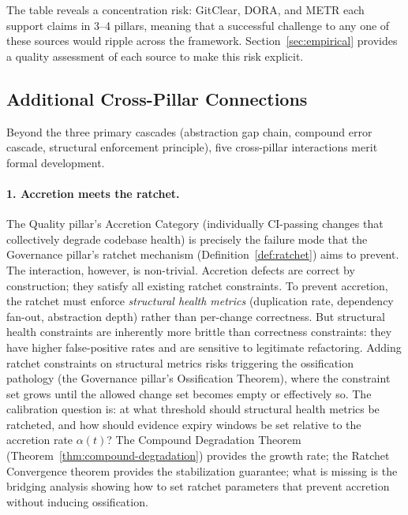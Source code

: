 The table reveals a concentration risk: GitClear, DORA, and METR each support claims in 3--4 pillars, meaning that a successful challenge to any one of these sources would ripple across the framework. Section~\ref{sec:empirical} provides a quality assessment of each source to make this risk explicit.

\subsection{Additional Cross-Pillar Connections}
\label{sec:missed-connections}

Beyond the three primary cascades (abstraction gap chain, compound error cascade, structural enforcement principle), five cross-pillar interactions merit formal development.

\paragraph{1. Accretion meets the ratchet.}
The Quality pillar's Accretion Category (individually CI-passing changes that collectively degrade codebase health) is precisely the failure mode that the Governance pillar's ratchet mechanism (Definition~\ref{def:ratchet}) aims to prevent. The interaction, however, is non-trivial. Accretion defects are correct by construction; they satisfy all existing ratchet constraints. To prevent accretion, the ratchet must enforce \emph{structural health metrics} (duplication rate, dependency fan-out, abstraction depth) rather than per-change correctness. But structural health constraints are inherently more brittle than correctness constraints: they have higher false-positive rates and are sensitive to legitimate refactoring. Adding ratchet constraints on structural metrics risks triggering the ossification pathology (the Governance pillar's Ossification Theorem), where the constraint set grows until the allowed change set becomes empty or effectively so. The calibration question is: at what threshold should structural health metrics be ratcheted, and how should evidence expiry windows be set relative to the accretion rate $\alpha(t)$? The Compound Degradation Theorem (Theorem~\ref{thm:compound-degradation}) provides the growth rate; the Ratchet Convergence theorem provides the stabilization guarantee; what is missing is the bridging analysis showing how to set ratchet parameters that prevent accretion without inducing ossification.

